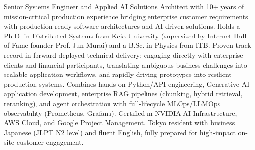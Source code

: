

\begin{cvparagraph}

Senior Systems Engineer and Applied AI Solutions Architect with 10+ years of mission-critical production experience bridging enterprise customer requirements with production-ready software architectures and AI-driven solutions. Holds a Ph.D. in Distributed Systems from Keio University (supervised by Internet Hall of Fame founder Prof. Jun Murai) and a B.Sc. in Physics from ITB. Proven track record in forward-deployed technical delivery: engaging directly with enterprise clients and financial participants, translating ambiguous business challenges into scalable application workflows, and rapidly driving prototypes into resilient production systems. Combines hands-on Python/API engineering, Generative AI application development, enterprise RAG pipelines (chunking, hybrid retrieval, reranking), and agent orchestration with full-lifecycle MLOps/LLMOps observability (Prometheus, Grafana). Certified in NVIDIA AI Infrastructure, AWS Cloud, and Google Project Management. Tokyo resident with business Japanese (JLPT N2 level) and fluent English, fully prepared for high-impact on-site customer engagement.
\end{cvparagraph}
